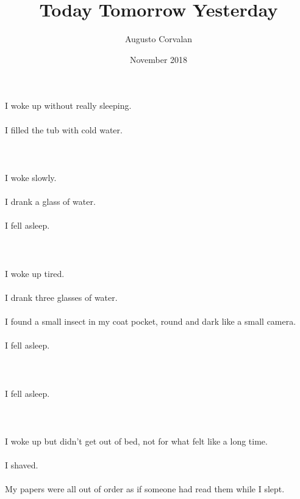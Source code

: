 \documentclass{article}
\title{Today Tomorrow Yesterday}
\date{November 2018}
\author{Augusto Corvalan}
\begin{document}
    \maketitle
    
    \section{}
    I woke up without really sleeping.\\\\I filled the tub with cold water.\\\\ 
    \newpage
    
    \section{}
    I woke slowly.\\\\I drank a glass of water.\\\\I fell asleep.\\\\ 
    \newpage
    
    \section{}
    I woke up tired.\\\\I drank three glasses of water.\\\\I found a small insect in my coat pocket, round and dark like a small camera.\\\\I fell asleep.\\\\ 
    \newpage
    
    \section{}
    I fell asleep.\\\\ 
    \newpage
    
    \section{}
    I woke up but didn't get out of bed, not for what felt like a long time.\\\\I shaved.\\\\My papers were all out of order as if someone had read them while I slept.\\\\ 
    \newpage
    
\end{document}
